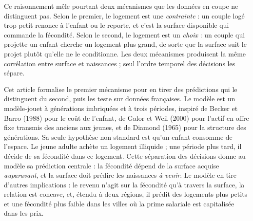 \documentclass[11pt,a4paper]{article}
\theoremstyle{plain}
\theoremstyle{definition}
\theoremstyle{remark}
\begin{document}
Ce raisonnement mêle pourtant deux mécanismes que les données en coupe ne distinguent pas. Selon le premier, le logement est une \emph{contrainte} : un couple logé trop petit renonce à l'enfant ou le reporte, et c'est la surface disponible qui commande la fécondité. Selon le second, le logement est un \emph{choix} : un couple qui projette un enfant cherche un logement plus grand, de sorte que la surface suit le projet plutôt qu'elle ne le conditionne. Les deux mécanismes produisent la même corrélation entre surface et naissances ; seul l'ordre temporel des décisions les sépare.

Cet article formalise le premier mécanisme pour en tirer des prédictions qui le distinguent du second, puis les teste sur données françaises. Le modèle est un modèle-jouet à générations imbriquées et à trois périodes, inspiré de Becker et Barro (1988) pour le coût de l'enfant, de Galor et Weil (2000) pour l'actif en offre fixe transmis des anciens aux jeunes, et de Diamond (1965) pour la structure des générations. Sa seule hypothèse non standard est qu'un enfant consomme de l'espace. Le jeune adulte achète un logement illiquide ; une période plus tard, il décide de sa fécondité dans ce logement. Cette séparation des décisions donne au modèle sa prédiction centrale : la fécondité dépend de la surface acquise \emph{auparavant}, et la surface doit prédire les naissances \emph{à venir}. Le modèle en tire d'autres implications : le revenu n'agit sur la fécondité qu'à travers la surface, la relation est concave, et, étendu à deux régions, il prédit des logements plus petits et une fécondité plus faible dans les villes où la prime salariale est capitalisée dans les prix.
\end{document}
